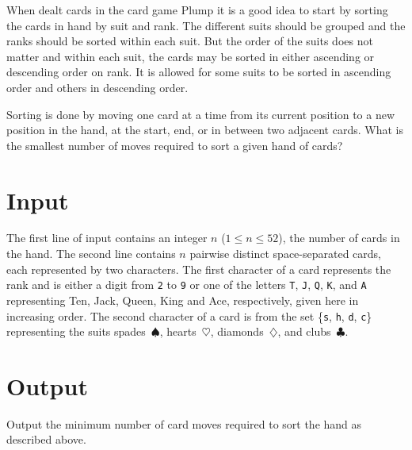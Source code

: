 
%
\noindent
When dealt cards in the card game Plump it is a good idea to start by sorting the cards in hand by suit and rank. The different suits should be grouped and the ranks should be sorted within each suit.  But the order of the suits does not matter and within each suit, the cards may be sorted in either ascending or descending order on rank.  It is allowed for some suits to be sorted in ascending order and others in descending order.

Sorting is done by moving one card at a time from its current position to a new position in the hand, at the start, end, or in between two adjacent cards.  What is the smallest number of moves required to sort a given hand of cards?

\section*{Input}

The first line of input contains an integer $n$ ($1 \le n \le 52$), the number of cards in the hand. The second line contains $n$ pairwise distinct space-separated cards, each represented by two characters. The first character of a card represents the rank and is either a digit from \texttt{2} to \texttt{9} or one of the letters \texttt{T}, \texttt{J}, \texttt{Q}, \texttt{K}, and \texttt{A} representing Ten, Jack, Queen, King and Ace, respectively, given here in increasing order. The second character of a card is from the set \{\texttt{s}, \texttt{h}, \texttt{d}, \texttt{c}\} representing the suits spades~$\spadesuit$, hearts~$\heartsuit$, diamonds~$\diamondsuit$, and clubs~$\clubsuit$.

\section*{Output}

Output the minimum number of card moves required to sort the hand as described above.


